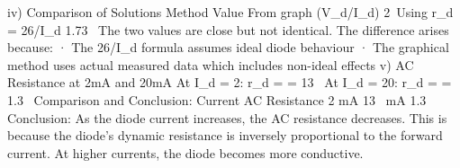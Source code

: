 iv) Comparison of Solutions
Method Value From graph (\Delta V_d/\Delta I_d) 2\ \Omega Using r_d = 26/I_d 1.73\ \Omega
The two values are close but not identical. The difference arises because:
· The 26/I_d formula assumes ideal diode behaviour · 
The graphical method uses actual measured data which includes non-ideal effects
v) AC Resistance at 2mA and 20mA
At I_d = 2: r_d =  = 13\ \Omega
At I_d = 20: r_d =  = 1.3\ \Omega
Comparison and Conclusion:
Current AC Resistance 2 mA 13\  mA 1.3\ \Omega
Conclusion: As the diode current increases, the AC resistance decreases. 
This is because the diode's dynamic resistance is inversely proportional to the forward current. 
At higher currents, the diode becomes more conductive.
